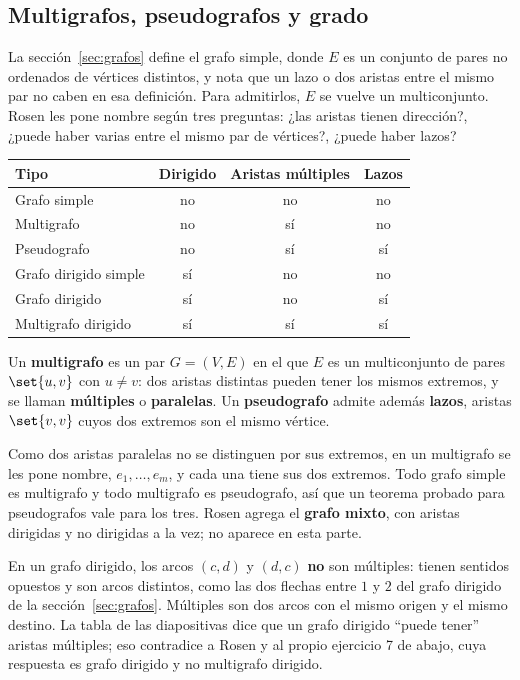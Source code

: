 \documentclass[11pt,letterpaper]{article}
\begin{document}
\subsection*{Multigrafos, pseudografos y grado}

La sección~\ref{sec:grafos} define el grafo simple, donde $E$ es un
conjunto de pares no ordenados de vértices distintos, y nota que un
lazo o dos aristas entre el mismo par no caben en esa definición. Para
admitirlos, $E$ se vuelve un multiconjunto. Rosen les pone nombre
según tres preguntas: ¿las aristas tienen dirección?, ¿puede haber
varias entre el mismo par de vértices?, ¿puede haber lazos?

\begin{center}
\small
\begin{tabular}{lccc}
  \toprule
  \textbf{Tipo} & \textbf{Dirigido} & \textbf{Aristas múltiples}
    & \textbf{Lazos} \\
  \midrule
  Grafo simple & no & no & no \\
  Multigrafo & no & sí & no \\
  Pseudografo & no & sí & sí \\
  Grafo dirigido simple & sí & no & no \\
  Grafo dirigido & sí & no & sí \\
  Multigrafo dirigido & sí & sí & sí \\
  \bottomrule
\end{tabular}
\end{center}

\begin{definicion}
  \label{def:pseudografo}
  Un \textbf{multigrafo} es un par $G = (V, E)$ en el que $E$ es un
  multiconjunto de pares $\set{u, v}$ con $u \neq v$: dos aristas
  distintas pueden tener los mismos extremos, y se llaman
  \textbf{múltiples} o \textbf{paralelas}. Un \textbf{pseudografo}
  admite además \textbf{lazos}, aristas $\set{v, v}$ cuyos dos extremos
  son el mismo vértice.
\end{definicion}

Como dos aristas paralelas no se distinguen por sus extremos, en un
multigrafo se les pone nombre, $e_1, \dots, e_m$, y cada una tiene sus
dos extremos. Todo grafo simple es multigrafo y todo multigrafo es
pseudografo, así que un teorema probado para pseudografos vale para
los tres. Rosen agrega el \textbf{grafo mixto}, con aristas dirigidas y
no dirigidas a la vez; no aparece en esta parte.

\begin{ojo}
  En un grafo dirigido, los arcos $(c, d)$ y $(d, c)$ \textbf{no} son
  múltiples: tienen sentidos opuestos y son arcos distintos, como las
  dos flechas entre $1$ y $2$ del grafo dirigido de la
  sección~\ref{sec:grafos}. Múltiples son dos arcos con el mismo origen
  y el mismo destino. La tabla de las diapositivas dice que un grafo
  dirigido ``puede tener'' aristas múltiples; eso contradice a Rosen y
  al propio ejercicio 7 de abajo, cuya respuesta es grafo dirigido y no
  multigrafo dirigido.
\end{ojo}
\end{document}
